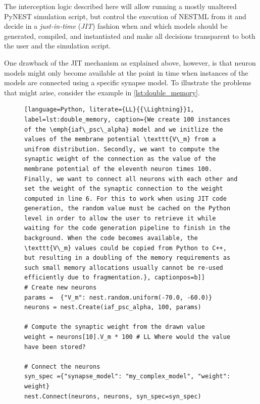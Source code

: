 The interception logic described here will allow running a mostly unaltered PyNEST simulation script, but control the execution of NESTML from it and decide in a \emph{just-in-time} (\emph{JIT}) fashion when and which models should be generated, compiled, and instantiated and make all decisions transparent to both the user and the simulation script.

One drawback of the JIT mechanism as explained above, however, is that neuron models might only become available at the point in time when instances of the models are connected using a specific synapse model. To illustrate the problems that might arise, consider the example in \autoref{lst:double_memory}.

\begin{figure}[ht!]
  \centering
\begin{lstlisting}[language=Python, literate={LL}{{\Lightning}}1, label=lst:double_memory, caption={We create 100 instances of the \emph{iaf\_psc\_alpha} model and we initlize the values of the membrane potential \texttt{V\_m} from a unifrom distribution. Secondly, we want to compute the synaptic weight of the connection as the value of the membrane potential of the eleventh neuron times 100. Finally, we want to connect all neurons with each other and set the weight of the synaptic connection to the weight computed in line 6. For this to work when using JIT code generation, the random value must be cached on the Python level in order to allow the user to retrieve it while waiting for the code generation pipeline to finish in the background. When the code becomes available, the \texttt{V\_m} values could be copied from Python to C++, but resulting in a doubling of the memory requirements as such small memory allocations usually cannot be re-used efficiently due to fragmentation.}, captionpos=b]]
# Create new neurons
params =  {"V_m": nest.random.uniform(-70.0, -60.0)}
neurons = nest.Create(iaf_psc_alpha, 100, params)

# Compute the synaptic weight from the drawn value
weight = neurons[10].V_m * 100 # LL Where would the value have been stored?

# Connect the neurons
syn_spec ={"synapse_model": "my_complex_model", "weight": weight}
nest.Connect(neurons, neurons, syn_spec=syn_spec)
\end{lstlisting}
\end{figure}


